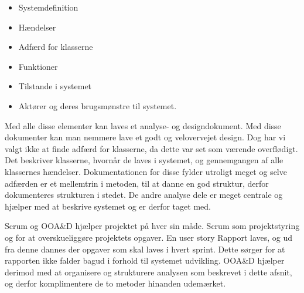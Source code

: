 \begin{itemize}
\item Systemdefinition
\item Hændelser
\item Adfærd for klasserne
\item Funktioner
\item Tilstande i systemet
\item Aktører og deres brugsmønstre til systemet.
\end{itemize}

Med alle disse elementer kan laves et analyse- og designdokument.
Med disse dokumenter kan man nemmere lave et godt og velovervejet design.
Dog har vi valgt ikke at finde adfærd for klasserne, da dette var set som værende overflødigt.
Det beskriver klasserne, hvornår de laves i systemet, og gennemgangen af alle klassernes hændelser. 
Dokumentationen for disse fylder utroligt meget og selve adfærden er et mellemtrin i metoden, til at danne en god struktur, derfor dokumenteres strukturen i stedet.
De andre analyse dele er meget centrale og hjælper med at beskrive systemet og er derfor taget med. 

Scrum og OOA\&D hjælper projektet på hver sin måde.
Scrum som projektstyring og for at overskueliggøre projektets opgaver. 
En user story Rapport laves, og ud fra denne dannes der opgaver som skal laves i hvert sprint. 
Dette sørger for at rapporten ikke falder bagud i forhold til systemet udvikling.
OOA\&D hjælper derimod med at organisere og strukturere analysen som beskrevet i dette afsnit, og derfor komplimentere de to metoder hinanden udemærket.









